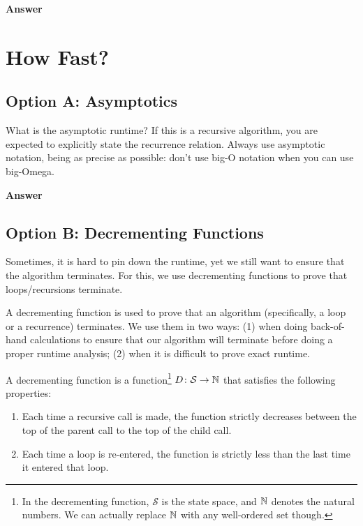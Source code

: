 \documentclass{article}
\begin{document}
\textbf{Answer}
\vspace{3in}


\pagebreak
\section{How Fast?}

\subsection{Option A: Asymptotics}
What is the asymptotic runtime?  If this is a recursive algorithm, you are expected to
explicitly state the recurrence relation.  Always use asymptotic notation, being
as precise as possible: don't use big-O notation when you can use big-Omega.

\textbf{Answer}
\vspace{1in}

\subsection{Option B: Decrementing Functions}
Sometimes, it is hard to pin down the runtime, yet we still want to ensure that
the algorithm terminates.  For this, we use decrementing functions to prove that
loops/recursions terminate.

A decrementing function is used to prove that an algorithm (specifically, a loop
or a recurrence) terminates.  We use
them in two ways: (1) when doing back-of-hand calculations to ensure that our
algorithm will terminate before doing a proper runtime analysis; (2) when it is
difficult to prove exact runtime.

\begin{definition}
    A decrementing function is a function\footnote{In the decrementing function,
    $\mathcal{S}$ is the state space, and ${\mathbb N}$ denotes the natural numbers.  We
    can actually replace ${\mathbb N}$ with any well-ordered set though.}
    $D \colon \mathcal{S} \to {\mathbb N}$ that
    satisfies the following properties:
    \begin{enumerate}[(1)]
        \item Each time a recursive call is made, the function strictly
            decreases between the top of the parent call to the top of the child
            call.
        \item Each time a loop is re-entered, the function is strictly less than
            the last time it entered that loop.
    \end{enumerate}
\end{definition}
\end{document}
